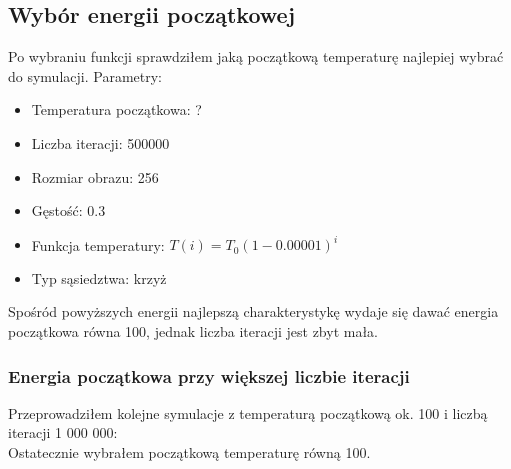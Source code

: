 \subsection{Wybór energii początkowej}
Po wybraniu funkcji sprawdziłem jaką początkową temperaturę najlepiej wybrać do symulacji.
Parametry:
\begin{itemize}
    \item Temperatura początkowa: ?
    \item Liczba iteracji: 500000
    \item Rozmiar obrazu: 256
    \item Gęstość: 0.3
    \item Funkcja temperatury: $T(i) = T_0(1-0.00001)^{i}$
    \item Typ sąsiedztwa: krzyż 
\end{itemize}

Spośród powyższych energii najlepszą charakterystykę wydaje się dawać energia początkowa równa 100, jednak liczba iteracji jest zbyt mała.

\subsubsection{Energia początkowa przy większej liczbie iteracji}
Przeprowadziłem kolejne symulacje z temperaturą początkową ok. 100 i liczbą iteracji 1 000 000:\\
Ostatecznie wybrałem początkową temperaturę równą 100.



